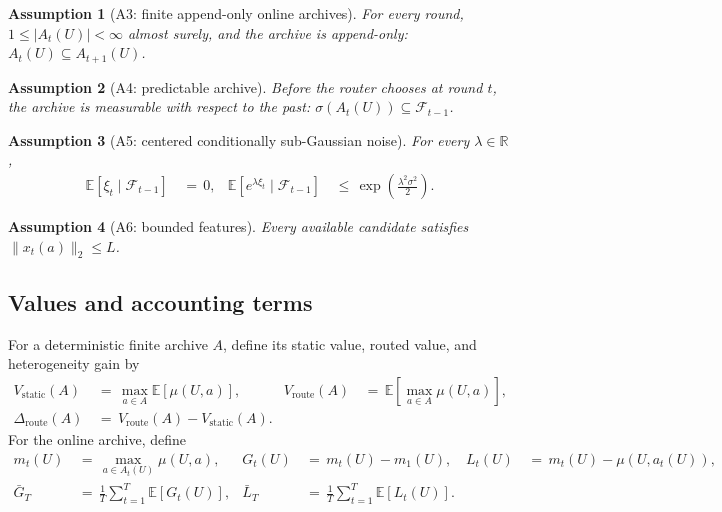 \documentclass{article} %
\newtheorem{assumption}{Assumption}
\begin{document}
\begin{assumption}[A3: finite append-only online archives]
\label{ass:app-append-only}
For every round, \(1\leq |A_t(U)|<\infty\) almost surely, and the archive is
append-only: \(A_t(U)\subseteq A_{t+1}(U)\).
\end{assumption}

\begin{assumption}[A4: predictable archive]
\label{ass:app-predictable}
Before the router chooses at round \(t\), the archive is measurable with
respect to the past: \(\sigma(A_t(U))\subseteq\mathcal F_{t-1}\).
\end{assumption}

\begin{assumption}[A5: centered conditionally sub-Gaussian noise]
\label{ass:app-noise}
For every \(\lambda\in\mathbb R\),
\begin{equation}
\begin{aligned}
\mathbb E[\xi_t\mid\mathcal F_{t-1}] &\,=\,0, &
\mathbb E\!\left[e^{\lambda\xi_t}\mid\mathcal F_{t-1}\right]
&\,\leq\,\exp\!\left(\frac{\lambda^2\sigma^2}{2}\right).
\end{aligned}
\end{equation}
\end{assumption}

\begin{assumption}[A6: bounded features]
\label{ass:app-features}
Every available candidate satisfies \(\|x_t(a)\|_2\leq L\).
\end{assumption}

\subsection{Values and accounting terms}

For a deterministic finite archive \(A\), define its static value, routed
value, and heterogeneity gain by
\begin{equation}
\begin{aligned}
V_{\mathrm{static}}(A)
&\,=\,\max_{a\in A}\mathbb E[\mu(U,a)], &
V_{\mathrm{route}}(A)
&\,=\,\mathbb E\!\left[\max_{a\in A}\mu(U,a)\right], \\
\Delta_{\mathrm{route}}(A)
&\,=\,V_{\mathrm{route}}(A)-V_{\mathrm{static}}(A).
\end{aligned}
\end{equation}
For the online archive, define
\begin{equation}
\begin{aligned}
m_t(U)
&\,=\,\max_{a\in A_t(U)}\mu(U,a), &
G_t(U)
&\,=\,m_t(U)-m_1(U), &
L_t(U)
&\,=\,m_t(U)-\mu(U,a_t(U)), \\
\bar G_T
&\,=\,\frac1T\sum_{t=1}^T\mathbb E[G_t(U)], &
\bar L_T
&\,=\,\frac1T\sum_{t=1}^T\mathbb E[L_t(U)].
\end{aligned}
\end{equation}
\end{document}
